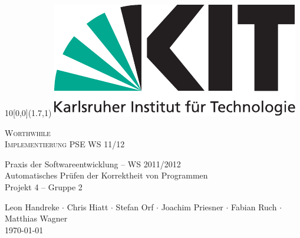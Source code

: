 
\newcommand{\diameter}{20}
\newcommand{\xone}{-30}
\newcommand{\xtwo}{150}
\newcommand{\yone}{15}
\newcommand{\ytwo}{-265}

\begin{titlepage}

	\begin{textblock}{10}[0,0](1.7,1)
		\includegraphics[width=.3\textwidth]{images/kit_logo_de_4c_positiv.pdf}
	\end{textblock}
	\begin{center}
		\fontsize{45}{50}\selectfont
        \vfill
        \textsc{Worthwhile} \\
        \textsc{Implementierung}
        \vfill
		\LARGE
		PSE WS 11/12
  \vfill
 \newpage
 
 \null
 \vfill
 
 Praxis der Softwareentwicklung -- WS 2011/2012 \\
 
  \Large
  Automatisches Prüfen der Korrektheit von Programmen \\
  Projekt 4 -- Gruppe 2 \\
  \medskip
  \vspace{2cm}
  
    Leon Handreke $\cdot$ Chris Hiatt $\cdot$ Stefan Orf $\cdot$ Joachim Priesner $\cdot$ Fabian Ruch $\cdot$ Matthias Wagner
  \vspace{2cm} \\
  \today
	\end{center}
	
  \vfill

\end{titlepage}

